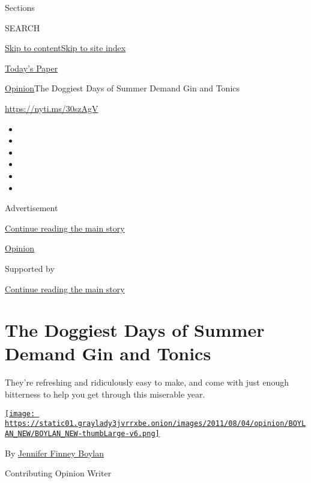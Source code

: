 Sections

SEARCH

\protect\hyperlink{site-content}{Skip to
content}\protect\hyperlink{site-index}{Skip to site index}

\href{https://myaccount.nytimes3xbfgragh.onion/auth/login?response_type=cookie\&client_id=vi}{}

\href{https://www.nytimes3xbfgragh.onion/section/todayspaper}{Today's
Paper}

\href{/section/opinion}{Opinion}\textbar{}The Doggiest Days of Summer
Demand Gin and Tonics

\url{https://nyti.ms/30szAgV}

\begin{itemize}
\item
\item
\item
\item
\item
\item
\end{itemize}

Advertisement

\protect\hyperlink{after-top}{Continue reading the main story}

\href{/section/opinion}{Opinion}

Supported by

\protect\hyperlink{after-sponsor}{Continue reading the main story}

\hypertarget{the-doggiest-days-of-summer-demand-gin-and-tonics}{%
\section{The Doggiest Days of Summer Demand Gin and
Tonics}\label{the-doggiest-days-of-summer-demand-gin-and-tonics}}

They're refreshing and ridiculously easy to make, and come with just
enough bitterness to help you get through this miserable year.

\href{https://topics.nytimes3xbfgragh.onion/top/reference/timestopics/people/b/jennifer_finney_boylan/index.html}{\texttt{[image: https://static01.graylady3jvrrxbe.onion/images/2011/08/04/opinion/BOYLAN\_NEW/BOYLAN\_NEW-thumbLarge-v6.png]}}

By
\href{https://topics.nytimes3xbfgragh.onion/top/reference/timestopics/people/b/jennifer_finney_boylan/index.html}{Jennifer
Finney Boylan}

Contributing Opinion Writer

